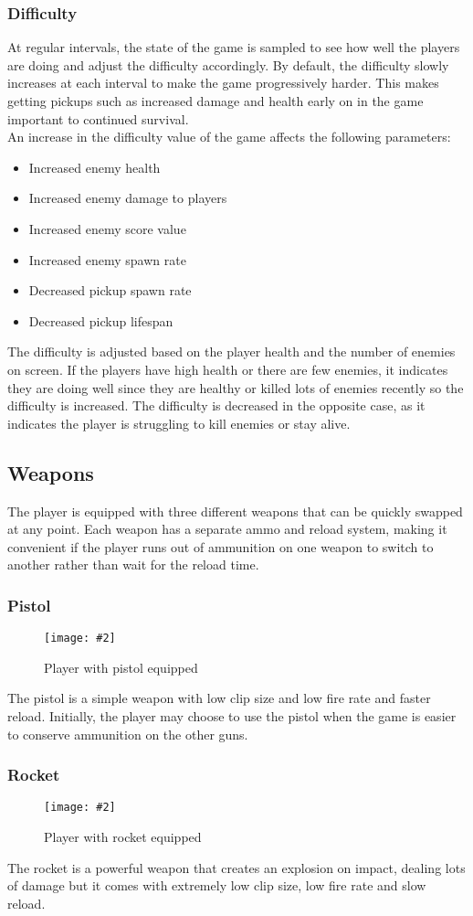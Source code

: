 \documentclass{article}
\newcommand{\n}[0]{\\[\baselineskip]}
\newcommand{\figimg}[3]{
  \begin{figure}[H]
    \centering
    \texttt{[image: \#2]}
    \caption{#3}
  \end{figure}
  \noindent 
}
\begin{document}
\subsubsection{Difficulty}
At regular intervals, the state of the game is sampled to see how well the players are doing and adjust the difficulty accordingly. By default, the difficulty slowly increases at each interval to make the game progressively harder. This makes getting pickups such as increased damage and health early on in the game important to continued survival.
\n
An increase in the difficulty value of the game affects the following parameters:
\begin{itemize}
\item Increased enemy health
\item Increased enemy damage to players
\item Increased enemy score value
\item Increased enemy spawn rate
\item Decreased pickup spawn rate
\item Decreased pickup lifespan
\end{itemize}
The difficulty is adjusted based on the player health and the number of enemies on screen. If the players have high health or there are few enemies, it indicates they are doing well since they are healthy or killed lots of enemies recently so the difficulty is increased. The difficulty is decreased in the opposite case, as it indicates the player is struggling to kill enemies or stay alive.

\subsection{Weapons}
The player is equipped with three different weapons that can be quickly swapped at any point. Each weapon has a separate ammo and reload system, making it convenient if the player runs out of ammunition on one weapon to switch to another rather than wait for the reload time.
\subsubsection{Pistol}
\figimg{0.1}{imgs/Gun.png}{Player with pistol equipped}
The pistol is a simple weapon with low clip size and low fire rate and faster reload. Initially, the player may choose to use the pistol when the game is easier to conserve ammunition on the other guns.

\subsubsection{Rocket}
\figimg{0.1}{imgs/Rocket.png}{Player with rocket equipped}
The rocket is a powerful weapon that creates an explosion on impact, dealing lots of damage but it comes with extremely low clip size, low fire rate and slow reload.
\end{document}

